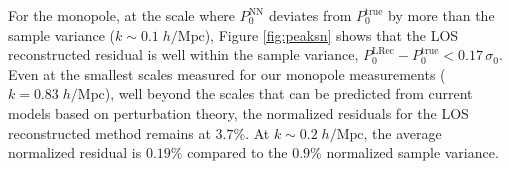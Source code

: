                                                                                                                                                                                                                                                                          For the monopole, at the scale where $P^\mathrm{NN}_0$ deviates from 
                                                                                                                                                                                                                                                                         $P^\mathrm{true}_0$ by more than the sample variance ($k \sim 0.1\;h/\mathrm{Mpc}$), 
                                                                                                                                                                                                                                                                         Figure \ref{fig:peaksn} shows that the LOS reconstructed residual is well within the 
                                                                                                                                                                                                                                                                         sample variance, $P^\mathrm{LRec}_0 - P^\mathrm{true}_0 < 0.17\, \sigma_0$. 
                                                                                                                                                                                                                                                                         Even at the smallest scales measured for our monopole measurements 
                                                                                                                                                                                                                                                                         ($k = 0.83\;h/\mathrm{Mpc}$), well beyond the scales that can be predicted from current models based on perturbation theory, the normalized residuals for 
                                                                                                                                                                                                                                                                         the LOS reconstructed method remains at $3.7\%$. At $k \sim 0.2\;h/\mathrm{Mpc}$, the average normalized 
                                                                                                                                                                                                                                                                         residual is $0.19\%$ compared to the $0.9\%$ normalized sample variance. 
